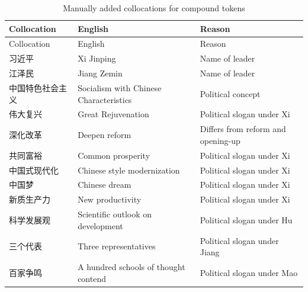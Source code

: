 \documentclass[
  letterpaper,
  abstract=true]{scrartcl}
\begin{document}
\begin{longtable}[]{@{}
  >{\raggedright\arraybackslash}p{}
  >{\raggedright\arraybackslash}p{}
  >{\raggedright\arraybackslash}p{}@{}}
\caption{Manually added collocations for compound
tokens}\label{tbl-manual-collo}\tabularnewline
\toprule\noalign{}
\begin{minipage}[b]{\linewidth}\raggedright
Collocation
\end{minipage} & \begin{minipage}[b]{\linewidth}\raggedright
English
\end{minipage} & \begin{minipage}[b]{\linewidth}\raggedright
Reason
\end{minipage} \\
\midrule\noalign{}
\endfirsthead
\toprule\noalign{}
\begin{minipage}[b]{\linewidth}\raggedright
Collocation
\end{minipage} & \begin{minipage}[b]{\linewidth}\raggedright
English
\end{minipage} & \begin{minipage}[b]{\linewidth}\raggedright
Reason
\end{minipage} \\
\midrule\noalign{}
\endhead
\bottomrule\noalign{}
\endlastfoot
习近平 & Xi Jinping & Name of leader \\
江泽民 & Jiang Zemin & Name of leader \\
中国特色社会主义 & Socialism with Chinese Characteristics & Political
concept \\
伟大复兴 & Great Rejuvenation & Political slogan under Xi \\
深化改革 & Deepen reform & Differs from reform and opening-up \\
共同富裕 & Common prosperity & Political slogan under Xi \\
中国式现代化 & Chinese style modernization & Political slogan under
Xi \\
中国梦 & Chinese dream & Political slogan under Xi \\
新质生产力 & New productivity & Political slogan under Xi \\
科学发展观 & Scientific outlook on development & Political slogan under
Hu \\
三个代表 & Three representatives & Political slogan under Jiang \\
百家争鸣 & A hundred schools of thought contend & Political slogan under
Mao \\
\end{longtable}
\end{document}
